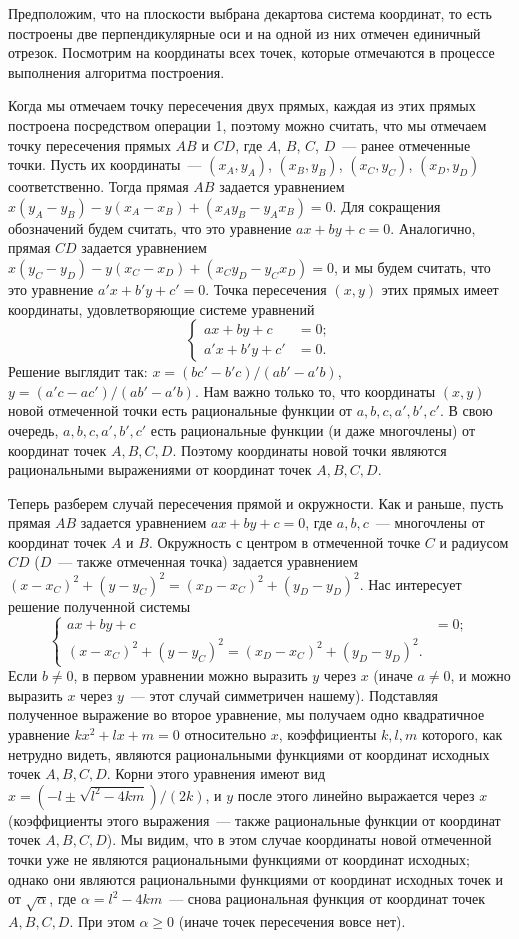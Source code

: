 \documentclass[a4paper,11pt]{scrartcl}
\theoremstyle{plain}
\theoremstyle{definition}
\begin{document}
Предположим, что на плоскости выбрана декартова система координат, то
есть построены две перпендикулярные оси и на одной из них отмечен
единичный отрезок. Посмотрим на координаты всех точек, которые
отмечаются в процессе выполнения алгоритма построения.

Когда мы отмечаем точку пересечения двух прямых, каждая из этих прямых
построена посредством операции 1, поэтому можно считать, что мы
отмечаем точку пересечения прямых $AB$ и $CD$, где $A$, $B$, $C$,
$D$~--- ранее отмеченные точки. Пусть их координаты~--- $(x_A,y_A)$,
$(x_B, y_B)$, $(x_C, y_C)$, $(x_D, y_D)$ соответственно.
Тогда прямая $AB$ задается уравнением
$x(y_A-y_B)-y(x_A-x_B)+(x_Ay_B-y_Ax_B)=0$. Для сокращения обозначений
будем считать, что это уравнение $ax+by+c=0$. Аналогично, прямая $CD$
задается уравнением $x(y_C-y_D)-y(x_C-x_D)+(x_Cy_D-y_Cx_D)=0$, и мы
будем считать, что это уравнение $a'x+b'y+c'=0$.
Точка пересечения $(x,y)$ этих прямых имеет координаты,
удовлетворяющие системе уравнений
$$
\left\{
\begin{aligned}
ax+by+c&=0;\\
a'x+b'y+c'&=0.
\end{aligned}
\right.
$$
Решение выглядит так: $x=(bc'-b'c)/(ab'-a'b)$,
$y=(a'c-ac')/(ab'-a'b)$. Нам важно только то, что координаты $(x,y)$
новой отмеченной точки есть рациональные функции от
$a,b,c,a',b',c'$. В свою очередь, $a,b,c,a',b',c'$ есть рациональные
функции (и даже многочлены) от координат точек $A,B,C,D$. Поэтому
координаты новой точки являются рациональными выражениями от координат
точек $A,B,C,D$.

Теперь разберем случай пересечения прямой и окружности. Как и раньше,
пусть прямая $AB$ задается уравнением $ax+by+c=0$, где $a,b,c$~---
многочлены от координат точек $A$ и $B$. Окружность с центром в
отмеченной точке $C$ и радиусом $CD$ ($D$~--- также отмеченная точка)
задается уравнением $(x-x_C)^2+(y-y_C)^2=(x_D-x_C)^2+(y_D-y_D)^2$. Нас
интересует решение полученной системы
$$
\left\{
\begin{aligned}
ax+by+c&=0;\\
(x-x_C)^2+(y-y_C)^2=(x_D-x_C)^2+(y_D-y_D)^2.
\end{aligned}
\right.
$$
Если $b\neq 0$, в первом уравнении можно выразить $y$ через $x$ (иначе
$a\neq 0$, и можно выразить $x$ через $y$~--- этот случай симметричен
нашему). Подставляя полученное выражение во второе уравнение, мы
получаем одно квадратичное уравнение $kx^2+lx+m=0$ относительно $x$,
коэффициенты $k,l,m$ которого, как нетрудно видеть, являются
рациональными функциями от координат исходных точек $A,B,C,D$. Корни
этого уравнения имеют вид $x=(-l\pm\sqrt{l^2-4km})/(2k)$, и $y$ после
этого линейно выражается через $x$ (коэффициенты этого выражения~---
также рациональные функции от координат точек $A,B,C,D$). Мы видим,
что в этом случае координаты новой отмеченной точки уже не являются
рациональными функциями от координат исходных; однако они являются
рациональными функциями от координат исходных точек и от
$\sqrt{\alpha}$, где $\alpha=l^2-4km$~--- снова рациональная функция
от координат точек $A,B,C,D$. При этом $\alpha\geq 0$ (иначе точек
пересечения вовсе нет).
\end{document}

